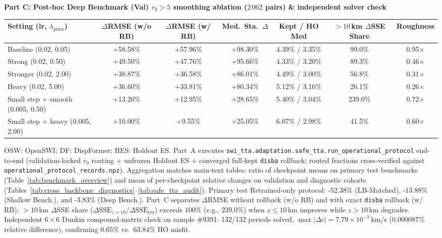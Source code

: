 \begin{table}[width=\textwidth,pos=htbp]
\vspace{4pt}
\noindent\textbf{Part C: Post-hoc Deep Benchmark (Val) $r_0 > 5$ smoothing ablation ($2\,062$ pairs) \& independent solver check}\\[2pt]
\begin{tabular*}{\textwidth}{@{\extracolsep{\fill}}lcccccc}
\toprule
Setting (lr, $\lambda_{\text{prior}}$) & $\Delta$RMSE (w/o RB) & $\Delta$RMSE (w/ RB) & Med.\ Sta.\ $\Delta$ & Kept / HO Med & $>10$\,km $\Delta$SSE Share & Roughness \\
\midrule
Baseline (0.02, 0.05) & +58.58\% & +57.96\% & +98.30\% & 4.39\% / 3.35\% & 99.0\% & 0.95$\times$ \\
Strong (0.02, 0.50) & +49.50\% & +47.76\% & +95.66\% & 4.33\% / 3.20\% & 89.3\% & 0.46$\times$ \\
Stronger (0.02, 2.00) & +38.87\% & +36.58\% & +86.01\% & 4.49\% / 3.00\% & 56.8\% & 0.31$\times$ \\
Heavy (0.02, 5.00) & +36.60\% & +33.81\% & +80.34\% & 5.12\% / 3.16\% & 26.1\% & 0.26$\times$ \\
Small step + smooth (0.005, 0.50) & +13.20\% & +12.95\% & +28.65\% & 5.40\% / 3.04\% & 239.0\% & 0.72$\times$ \\
Small step + heavy (0.005, 2.00) & +10.00\% & +9.55\% & +25.05\% & 6.07\% / 2.98\% & 41.5\% & 0.60$\times$ \\
\bottomrule
\end{tabular*}
\par\vspace{3pt}\noindent\footnotesize{OSW: OpenSWI; DF: DispFormer; HES: Holdout ES. Part~A executes \texttt{swi\_tta.adaptation.safe\_tta.run\_operational\_protocol} end-to-end (validation-locked $r_0$ routing + unfrozen Holdout ES + converged full-kept \texttt{disba} rollback; routed fractions cross-verified against \texttt{operational\_protocol\_records.npz}). Aggregation matches main-text tables: ratio of checkpoint means on primary test benchmarks (Table~\ref{tab:benchmark_overview}) and mean of per-checkpoint relative changes on validation and diagnostic cohorts (Tables~\ref{tab:cross_backbone_diagnostics}--\ref{tab:safe_tta_audit}). Primary test Retrained-only protocol: -52.38\% (LB-Matched), -13.88\% (Shallow Bench.), and -3.83\% (Deep Bench.). Part~C separates $\Delta$RMSE without rollback (w/o RB) and with exact \texttt{disba} rollback (w/ RB); $>10$\,km $\Delta$SSE share ($\Delta\text{SSE}_{z>10} / \Delta\text{SSE}_{\text{res}}$) exceeds $100\%$ (e.g., $239.0\%$) when $z \le 10$\,km improves while $z > 10$\,km degrades. Independent $6\times 6$ Dunkin compound-matrix check on sample \#9391: 132/132 periods solved, $\max|\Delta c| = 7.79\times 10^{-7}$\,km/s ($0.000087\%$ relative difference), confirming $0.65\%$ vs.\ $63.84\%$ HO misfit.}
\end{table}
